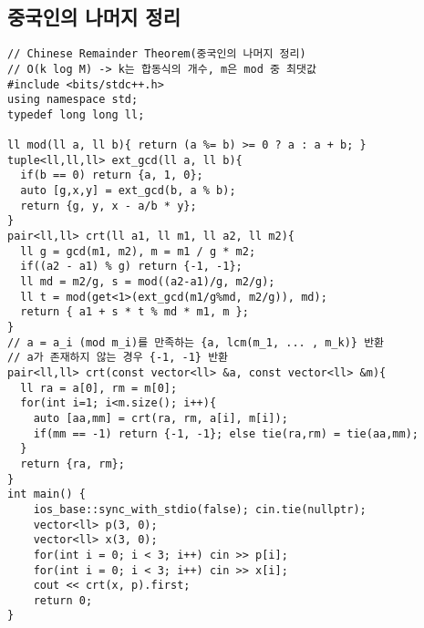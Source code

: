 \documentclass[landscape, 8pt, a4paper, oneside, twocolumn]{extarticle}
\begin{document}
    \subsection{중국인의 나머지 정리}
    \begin{verbatim}
// Chinese Remainder Theorem(중국인의 나머지 정리)
// O(k log M) -> k는 합동식의 개수, m은 mod 중 최댓값
#include <bits/stdc++.h>
using namespace std;
typedef long long ll;

ll mod(ll a, ll b){ return (a %= b) >= 0 ? a : a + b; }
tuple<ll,ll,ll> ext_gcd(ll a, ll b){
  if(b == 0) return {a, 1, 0};
  auto [g,x,y] = ext_gcd(b, a % b);
  return {g, y, x - a/b * y};
}
pair<ll,ll> crt(ll a1, ll m1, ll a2, ll m2){
  ll g = gcd(m1, m2), m = m1 / g * m2;
  if((a2 - a1) % g) return {-1, -1};
  ll md = m2/g, s = mod((a2-a1)/g, m2/g);
  ll t = mod(get<1>(ext_gcd(m1/g%md, m2/g)), md);
  return { a1 + s * t % md * m1, m };
}
// a = a_i (mod m_i)를 만족하는 {a, lcm(m_1, ... , m_k)} 반환
// a가 존재하지 않는 경우 {-1, -1} 반환
pair<ll,ll> crt(const vector<ll> &a, const vector<ll> &m){
  ll ra = a[0], rm = m[0];
  for(int i=1; i<m.size(); i++){
    auto [aa,mm] = crt(ra, rm, a[i], m[i]);
    if(mm == -1) return {-1, -1}; else tie(ra,rm) = tie(aa,mm);
  }
  return {ra, rm};
}
int main() {
    ios_base::sync_with_stdio(false); cin.tie(nullptr);
    vector<ll> p(3, 0);
    vector<ll> x(3, 0);
    for(int i = 0; i < 3; i++) cin >> p[i];
    for(int i = 0; i < 3; i++) cin >> x[i];
    cout << crt(x, p).first;
    return 0;
}
    \end{verbatim}
\end{document}
